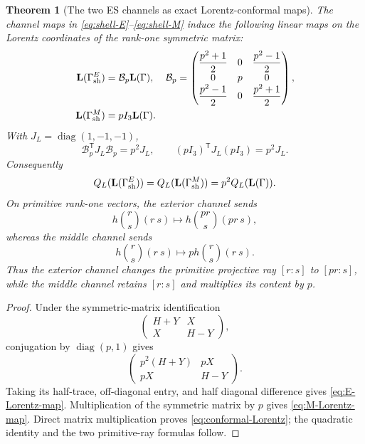 \documentclass[11pt]{article}
\newtheorem{theorem}{Theorem}[section]
\theoremstyle{definition}
\theoremstyle{remark}
\newcommand{\diag}{\operatorname{diag}}
\begin{document}
\begin{theorem}[The two ES channels as exact Lorentz-conformal maps]
\label{thm:channel-lorentz-maps}
The channel maps in \eqref{eq:shell-E}--\eqref{eq:shell-M} induce the following
linear maps on the Lorentz coordinates of the rank-one symmetric matrix:
\begin{align}
 \mathbf L(\Gamma_{\rm sh}^{E})
 &=\mathcal B_p\mathbf L(\Gamma),
 &\mathcal B_p
 &=\begin{pmatrix}
 \dfrac{p^2+1}{2}&0&\dfrac{p^2-1}{2}\\
 0&p&0\\
 \dfrac{p^2-1}{2}&0&\dfrac{p^2+1}{2}
 \end{pmatrix},
 \label{eq:E-Lorentz-map}\\
 \mathbf L(\Gamma_{\rm sh}^{M})
 &=pI_3\mathbf L(\Gamma).
 \label{eq:M-Lorentz-map}
\end{align}
With \(J_L=\diag(1,-1,-1)\),
\begin{equation}\label{eq:conformal-Lorentz}
 \mathcal B_p^{\mathsf T}J_L\mathcal B_p=p^2J_L,
 \qquad
 (pI_3)^{\mathsf T}J_L(pI_3)=p^2J_L.
\end{equation}
Consequently
\begin{equation}\label{eq:channel-Q-scaling}
 Q_L(\mathbf L(\Gamma_{\rm sh}^{E}))
 =Q_L(\mathbf L(\Gamma_{\rm sh}^{M}))
 =p^2Q_L(\mathbf L(\Gamma)).
\end{equation}
On primitive rank-one vectors, the exterior channel sends
\begin{equation}\label{eq:E-ray-map}
 h\binom r s(r\ s)
 \longmapsto
 h\binom{pr}{s}(pr\ s),
\end{equation}
whereas the middle channel sends
\begin{equation}\label{eq:M-ray-map}
 h\binom r s(r\ s)
 \longmapsto
 ph\binom r s(r\ s).
\end{equation}
Thus the exterior channel changes the primitive projective ray
\([r:s]\) to \([pr:s]\), while the middle channel retains \([r:s]\) and
multiplies its content by \(p\).
\end{theorem}

\begin{proof}
Under the symmetric-matrix identification
\[
 \begin{pmatrix}H+Y&X\\X&H-Y\end{pmatrix},
\]
conjugation by \(\diag(p,1)\) gives
\[
 \begin{pmatrix}p^2(H+Y)&pX\\pX&H-Y\end{pmatrix}.
\]
Taking its half-trace, off-diagonal entry, and half diagonal difference gives
\eqref{eq:E-Lorentz-map}.  Multiplication of the symmetric matrix by \(p\)
gives \eqref{eq:M-Lorentz-map}.  Direct matrix multiplication proves
\eqref{eq:conformal-Lorentz}; the quadratic identity and the two primitive-ray
formulas follow.
\end{proof}
\end{document}
